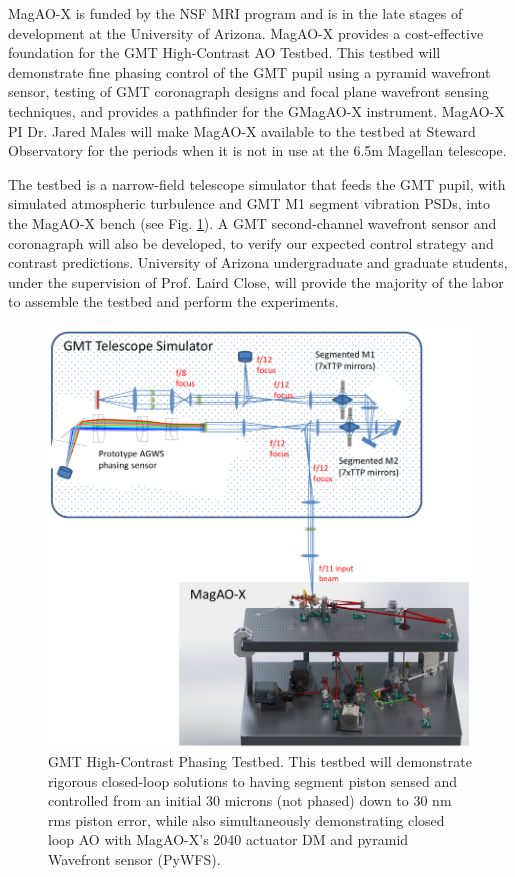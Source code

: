 \documentclass[12pt,preprint]{aastex}
\begin{document}
MagAO-X is funded by the NSF MRI program and is in the late stages of development at the University of Arizona. MagAO-X provides a cost-effective foundation for the GMT High-Contrast AO Testbed. This testbed will demonstrate fine phasing control of the GMT pupil using a pyramid wavefront sensor, testing of GMT coronagraph designs and focal plane wavefront sensing techniques, and provides a pathfinder for the GMagAO-X instrument. MagAO-X PI Dr. Jared Males will make MagAO-X available to the testbed at Steward Observatory for the periods when it is not in use at the 6.5m Magellan telescope. 

The testbed is a narrow-field telescope simulator that feeds the GMT pupil, with simulated atmospheric turbulence and GMT M1 segment vibration PSDs, into the MagAO-X bench (see Fig. \ref{fig:testbed}). A GMT second-channel wavefront sensor and coronagraph will also be developed, to verify our expected control strategy and contrast predictions. University of Arizona undergraduate and graduate students, under the supervision of Prof. Laird Close, will provide the majority of the labor to assemble the testbed and perform the experiments.
 
 \begin{figure} [h!]
\centering
\includegraphics[width=6in]{figures/Testbed_figure.png}
\caption{GMT High-Contrast Phasing Testbed. This testbed will demonstrate rigorous closed-loop solutions to having segment piston sensed and controlled from an initial 30 microns (not phased) down to 30 nm rms piston error, while also simultaneously demonstrating closed loop AO with MagAO-X's 2040 actuator DM and pyramid Wavefront sensor (PyWFS).  \label{fig:testbed}}
\end{figure}
 
\end{document}
